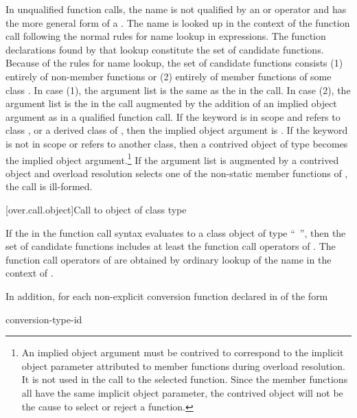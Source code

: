 \pnum
In unqualified function calls, the name is not qualified by an
\tcode{->}
or
operator and has the more general form of a
.
The name is looked up in the context of the function
call following the normal rules for name lookup
in expressions.
The function declarations found by that lookup constitute the
set of candidate functions.
Because of the rules for name lookup, the set of candidate functions
consists (1) entirely of non-member functions or (2) entirely of
member functions of some class
.
In case (1),
the argument list is
the same as the
in the call.
In case (2), the argument list is the
in the call augmented by the addition of an implied object
argument as in a qualified function call.
If the keyword
 is in scope and refers to
class
,
or a derived class of
,
then the implied object argument is
.
If the keyword
is not in
scope or refers to another class, then
a contrived object of type
becomes the implied object
argument.\footnote{An implied object argument must be contrived to
correspond to the implicit object
parameter attributed to member functions during overload resolution.
It is not
used in
the call to the selected function.
Since the member functions all have the
same implicit
object parameter, the contrived object will not be the cause to select or
reject a
function.}
If the argument list is augmented by a contrived object and overload
resolution selects one of the non-static member functions of
,
the call is ill-formed.

[over.call.object]{Call to object of class type}

\pnum
If the
in the function call syntax evaluates
to a class object of type ``\cv{}~'',
then the set of candidate
functions includes at least the function call operators of
.
The
function call operators of
are obtained by ordinary lookup of
the name
in the context of
.

\pnum
In addition, for each non-explicit conversion function declared in  of the
form

\begin{ncsimplebnf}
 conversion-type-id \terminal{(\,)}     \terminal{;}
\end{ncsimplebnf}

